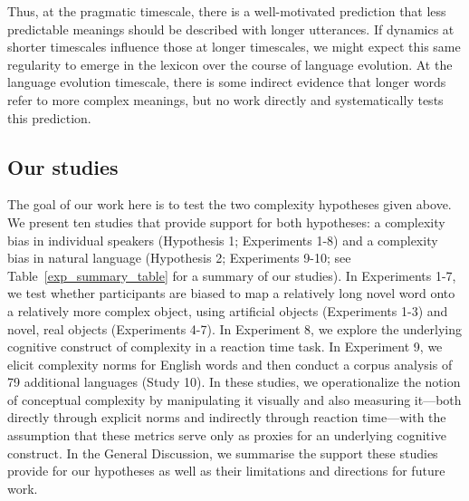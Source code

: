 \documentclass[man]{apa2}
\begin{document}
Thus, at the pragmatic timescale, there is a well-motivated prediction that less predictable meanings should be described with longer utterances. If dynamics at shorter timescales influence those at longer timescales, we might expect this same regularity to emerge in the lexicon over the course of language evolution. At the language evolution timescale, there is some indirect evidence that longer words refer to more complex meanings, but no work directly and systematically tests this prediction. 

\subsection{Our studies}

The goal of our work here is to test the two complexity hypotheses given above. We present ten studies that provide support for both hypotheses: a complexity bias in individual speakers (Hypothesis 1; Experiments 1-8) and a complexity bias in natural language (Hypothesis 2; Experiments 9-10; see Table~\ref{exp_summary_table} for a summary of our studies). In Experiments 1-7, we test whether participants are biased to map a relatively long novel word onto a relatively more complex object, using artificial objects (Experiments 1-3) and novel, real objects (Experiments 4-7). In Experiment 8, we explore the underlying cognitive construct of complexity in a reaction time task. In Experiment 9, we elicit complexity norms for English words and then conduct a corpus analysis of 79 additional languages (Study 10). In these studies, we operationalize the notion of conceptual complexity by manipulating it visually and also measuring it---both directly through explicit norms and indirectly through reaction time---with the assumption that these metrics serve only as proxies for an underlying cognitive construct. In the General Discussion, we summarise the support these studies provide for our hypotheses as well as their limitations and directions for future work. 
\end{document}
